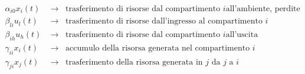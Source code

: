 \begin{center}
\begin{align*}
		\alpha_{i0} x_i(t) &\rightarrow \;\; \text{trasferimento di risorse dal compartimento } i \text{all'ambiente, perdite} \\
		\beta_{li} u_l(t) &\rightarrow \;\; \text{trasferimento di risorse dall'ingresso al compartimento } i \\
		\beta_{ih} u_h(t) &\rightarrow \;\; \text{trasferimento di risorse dal compartimento } i \text{all'uscita} \\
		\gamma_{ii} x_i(t) &\rightarrow \;\; \text{accumulo della risorsa generata nel compartimento } i  \\
		\gamma_{ji} x_j(t) &\rightarrow \;\; \text{trasferimento della risorsa generata in } j \text{ da } j \text{ a } i
	\end{align*}
\end{center}

